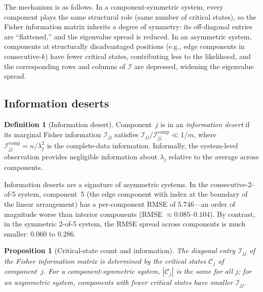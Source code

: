 \documentclass[12pt]{article}
\newtheorem{proposition}[theorem]{Proposition}
\theoremstyle{definition}
\newtheorem{definition}[theorem]{Definition}
\theoremstyle{remark}
\begin{document}
The mechanism is as follows.  In a component-symmetric system, every
component plays the same structural role (same number of critical
states), so the Fisher information matrix inherits a degree of
symmetry: its off-diagonal entries are ``flattened,'' and the
eigenvalue spread is reduced.  In an asymmetric system, components at
structurally disadvantaged positions (e.g., edge components in
consecutive-$k$) have fewer critical states, contributing less to the
likelihood, and the corresponding rows and columns of $\mathcal{I}$
are depressed, widening the eigenvalue spread.

\subsection{Information deserts}
\label{sec:info-deserts}

\begin{definition}[Information desert]
\label{def:info-desert}
Component~$j$ is in an \emph{information desert} if its marginal
Fisher information $\mathcal{I}_{jj}$ satisfies
$\mathcal{I}_{jj} / \mathcal{I}_{jj}^{\mathrm{comp}} \ll 1/m$,
where $\mathcal{I}_{jj}^{\mathrm{comp}} = n/\lambda_j^2$ is the
complete-data information.  Informally, the system-level observation
provides negligible information about $\lambda_j$ relative to the
average across components.
\end{definition}

Information deserts are a signature of asymmetric systems.  In the
consecutive-2-of-5 system, component~5 (the edge component with
index at the boundary of the linear arrangement) has a per-component
RMSE of $5.746$---an order of magnitude worse than interior components
(RMSE $\approx 0.085$--$0.104$).  By contrast, in the symmetric
2-of-5 system, the RMSE spread across components is much smaller:
$0.060$ to $0.286$.

\begin{proposition}[Critical-state count and information]
\label{prop:critical-count}
The diagonal entry $\mathcal{I}_{jj}$ of the Fisher information matrix
is determined by the critical states $\mathcal{C}_j$ of component~$j$.
For a component-symmetric system, $|\mathcal{C}_j|$ is the same for
all $j$; for an asymmetric system, components with fewer critical
states have smaller $\mathcal{I}_{jj}$.
\end{proposition}
\end{document}

